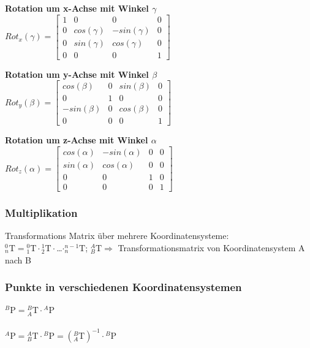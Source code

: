  
 \begin{minipage}{0.33\linewidth}
     \textbf{Rotation um x-Achse mit Winkel $ \gamma$}\newline
     $ Rot_x(\gamma)=\begin{bmatrix}
     1 & 0 & 0 & 0 \\ 
     0 & cos(\gamma) & -sin(\gamma) & 0 \\ 
     0 & sin(\gamma) & cos(\gamma) & 0 \\ 
     0 & 0 & 0 & 1
     \end{bmatrix}$
 \end{minipage}    
 \begin{minipage}{0.33\linewidth}
     \textbf{Rotation um y-Achse mit Winkel $ \beta$}\newline
     $ Rot_y(\beta)=\begin{bmatrix}
     cos(\beta)& 0  & sin(\beta)  & 0  \\ 
     0 & 1 & 0 & 0  \\ 
     -sin(\beta)&  0 & cos(\beta) & 0 \\ 
     0 & 0 & 0  & 1
     \end{bmatrix}$
 \end{minipage}
 \begin{minipage}{0.33\linewidth}
     \textbf{Rotation um z-Achse mit Winkel $\alpha$}\newline
     $Rot_z(\alpha)=\begin{bmatrix}
     cos(\alpha)& -sin(\alpha) & 0 & 0 \\ 
     sin(\alpha)&  cos(\alpha)& 0 & 0 \\ 
     0 & 0 & 1 & 0 \\ 
     0 & 0 & 0 & 1
     \end{bmatrix} $
 \end{minipage} 
 
 \subsubsection{Multiplikation }
 Transformations Matrix über mehrere Koordinatensysteme:\\
 
 ${}^0_n\mathrm{T}={}^0_1\mathrm{T}\cdot{}^1_2\mathrm{T}\cdot{}$\ldots$\cdot{}^{n-1}_n\mathrm{T}$;
 \space\space\space\space ${}^A_B\mathrm{T} \Rightarrow$
 Transformationsmatrix von Koordinatensystem A nach B
 
 \subsubsection{Punkte in verschiedenen Koordinatensystemen }
 ${}^B\mathrm{P}={}^B_A\mathrm{T}\cdot{}^A\mathrm{P}$ \\ \\
 ${}^A\mathrm{P}={}^A_B\mathrm{T}\cdot{}^B\mathrm{P}=({}^B_A\mathrm{T})^{-1}\cdot{}^B\mathrm{P}$
 
